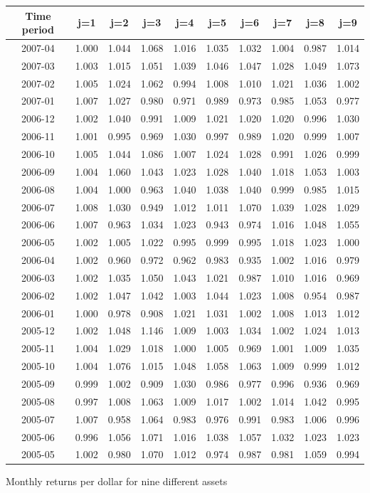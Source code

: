 \documentclass{article}
\begin{document}
\pagebreak
\begin{center}
\begin{tabular}{ |c|c|c|c|c|c|c|c|c|c| } 
\hline
Time period & j=1 & j=2 & j=3 & j=4 & j=5 & j=6 & j=7 & j=8 & j=9 \\
\hline
2007-04 & 1.000 & 1.044 &1.068& 1.016& 1.035 &1.032 &1.004 &0.987 &1.014\\
2007-03 &1.003 &1.015& 1.051& 1.039& 1.046 &1.047 &1.028 &1.049 &1.073\\
2007-02 &1.005 &1.024 &1.062& 0.994 &1.008& 1.010 &1.021& 1.036 &1.002\\
2007-01& 1.007 &1.027 &0.980& 0.971 &0.989 &0.973& 0.985 &1.053 &0.977\\
2006-12 &1.002 &1.040 &0.991& 1.009 &1.021 &1.020 &1.020 &0.996 &1.030\\
2006-11 &1.001& 0.995 &0.969& 1.030 &0.997 &0.989 &1.020 &0.999& 1.007\\
2006-10 &1.005 &1.044 &1.086& 1.007 &1.024& 1.028 &0.991 &1.026& 0.999\\
2006-09 &1.004& 1.060 &1.043& 1.023 &1.028& 1.040 &1.018& 1.053& 1.003\\
2006-08 &1.004 &1.000 &0.963& 1.040& 1.038 &1.040 &0.999 &0.985& 1.015\\
2006-07 &1.008 &1.030 &0.949& 1.012 &1.011 &1.070 &1.039& 1.028& 1.029\\
2006-06 &1.007 &0.963 &1.034& 1.023 &0.943 &0.974 &1.016& 1.048& 1.055\\
2006-05 &1.002 &1.005 &1.022 &0.995 &0.999 &0.995 &1.018& 1.023& 1.000\\
2006-04 &1.002 &0.960 &0.972& 0.962 &0.983 &0.935 &1.002 &1.016& 0.979\\
2006-03 &1.002 &1.035 &1.050& 1.043 &1.021 &0.987 &1.010 &1.016 &0.969\\
2006-02 &1.002 &1.047& 1.042& 1.003 &1.044 &1.023 &1.008& 0.954& 0.987\\
2006-01& 1.000 &0.978& 0.908& 1.021 &1.031& 1.002 &1.008& 1.013& 1.012\\
2005-12 &1.002 &1.048& 1.146 &1.009 &1.003& 1.034 &1.002& 1.024& 1.013\\
2005-11 &1.004 &1.029 &1.018 &1.000 &1.005& 0.969 &1.001& 1.009& 1.035\\
2005-10 &1.004 &1.076 &1.015 &1.048 &1.058& 1.063& 1.009 &0.999& 1.012\\
2005-09 &0.999 &1.002 &0.909 &1.030& 0.986& 0.977& 0.996& 0.936& 0.969\\
2005-08 &0.997 &1.008 &1.063& 1.009 &1.017& 1.002 &1.014 &1.042 &0.995\\
2005-07 &1.007 &0.958 &1.064& 0.983 &0.976& 0.991& 0.983 &1.006 &0.996\\
2005-06 &0.996 &1.056 &1.071& 1.016 &1.038 &1.057& 1.032 &1.023 &1.023\\
2005-05 &1.002 &0.980 &1.070& 1.012 &0.974 &0.987& 0.981 &1.059 &0.994\\
\hline
\end{tabular}
\end{center}
\caption{Monthly returns per dollar for nine different assets}
\end{document}
